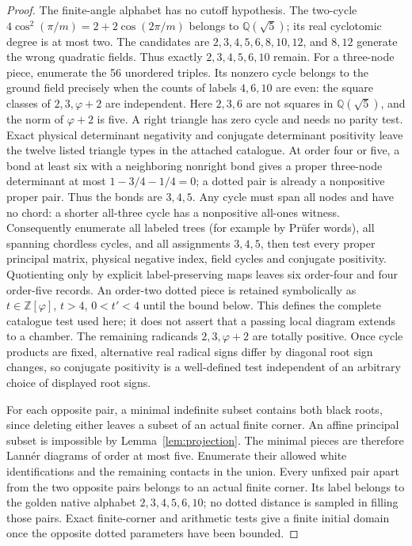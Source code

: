 \documentclass[11pt]{article}
\newcommand{\Q}{\mathbb Q}
\begin{document}
\begin{proof}
The finite-angle alphabet has no cutoff hypothesis. The two-cycle
$4\cos^2(\pi/m)=2+2\cos(2\pi/m)$ belongs to $\Q(\sqrt5)$;
its real cyclotomic degree is at most two. The candidates are
$2,3,4,5,6,8,10,12$, and $8,12$ generate the wrong quadratic
fields. Thus exactly $2,3,4,5,6,10$ remain.
For a three-node piece, enumerate the 56 unordered triples. Its
nonzero cycle belongs to the ground field precisely when the counts
of labels $4,6,10$ are even: the square classes of $2,3,\varphi+2$
are independent. Here $2,3,6$ are not squares in $\Q(\sqrt5)$,
and the norm of $\varphi+2$ is five. A right triangle has zero cycle
and needs no parity test. Exact physical determinant negativity and
conjugate determinant positivity leave the twelve listed triangle
types in the attached catalogue.
At order four or five, a bond at least six with a neighboring
nonright bond gives a proper three-node determinant at most
$1-3/4-1/4=0$; a dotted pair is already a nonpositive proper pair.
Thus the bonds are $3,4,5$. Any cycle must span all nodes and have
no chord: a shorter all-three cycle has a nonpositive all-ones
witness. Consequently enumerate all labeled trees (for example by
Pr\"ufer words), all spanning chordless cycles, and all assignments
$3,4,5$, then test every proper principal matrix, physical negative
index, field cycles and conjugate positivity. Quotienting only by
explicit label-preserving maps leaves six order-four and four
order-five records. An order-two dotted piece is retained symbolically
as $t\in\mathbb Z[\varphi]$, $t>4$, $0<t'<4$ until the bound below.
This defines the complete catalogue test used here; it does not
assert that a passing local diagram extends to a chamber.
The remaining radicands $2,3,\varphi+2$ are totally positive.
Once cycle products are fixed, alternative real radical signs differ
by diagonal root sign changes, so conjugate positivity is a well-defined
test independent of an arbitrary choice of displayed root signs.

For each opposite pair, a minimal indefinite subset contains both
black roots, since deleting either leaves a subset of an actual
finite corner. An affine principal subset is impossible by
Lemma~\ref{lem:projection}. The minimal pieces are therefore
Lann\'er diagrams of order at most five. Enumerate their allowed
white identifications and the remaining contacts in the union.
Every unfixed pair apart from the two opposite pairs belongs to an
actual finite corner. Its label belongs to the golden native
alphabet $2,3,4,5,6,10$; no dotted distance is sampled in filling
those pairs. Exact finite-corner and arithmetic tests give a finite
initial domain once the opposite dotted parameters have been bounded.


\end{proof}
\end{document}
